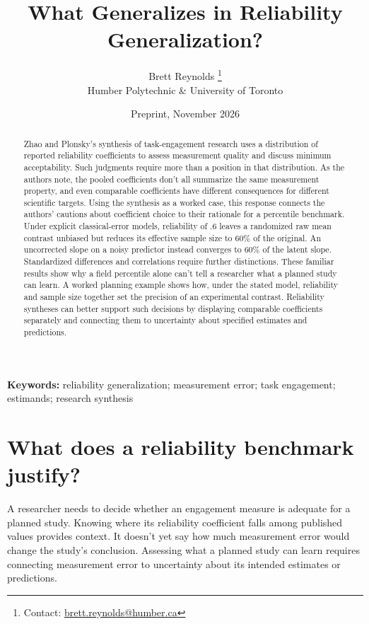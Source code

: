 \documentclass[12pt,twoside]{article}
\title{What Generalizes in Reliability Generalization?}
\author{Brett Reynolds \orcidlink{0000-0003-0073-7195}%
\thanks{Contact: \href{mailto:brett.reynolds@humber.ca}{brett.reynolds@humber.ca}}\\
Humber Polytechnic \& University of Toronto}
\date{Preprint, November 2026}
\begin{document}
\maketitle

\begin{abstract}
Zhao and Plonsky's synthesis of task-engagement research uses a distribution of reported reliability coefficients to assess measurement quality and discuss minimum acceptability. Such judgments require more than a position in that distribution. As the authors note, the pooled coefficients don't all summarize the same measurement property, and even comparable coefficients have different consequences for different scientific targets. Using the synthesis as a worked case, this response connects the authors' cautions about coefficient choice to their rationale for a percentile benchmark. Under explicit classical-error models, reliability of .6 leaves a randomized raw mean contrast unbiased but reduces its effective sample size to 60\% of the original. An uncorrected slope on a noisy predictor instead converges to 60\% of the latent slope. Standardized differences and correlations require further distinctions. These familiar results show why a field percentile alone can't tell a researcher what a planned study can learn. A worked planning example shows how, under the stated model, reliability and sample size together set the precision of an experimental contrast. Reliability syntheses can better support such decisions by displaying comparable coefficients separately and connecting them to uncertainty about specified estimates and predictions.
\end{abstract}

\noindent\textbf{Keywords:} reliability generalization; measurement error; task engagement; estimands; research synthesis

\section{What does a reliability benchmark justify?}

A researcher needs to decide whether an engagement measure is adequate for a planned study. Knowing where its reliability coefficient falls among published values provides context. It doesn't yet say how much measurement error would change the study's conclusion. Assessing what a planned study can learn requires connecting measurement error to uncertainty about its intended estimates or predictions.
\end{document}
